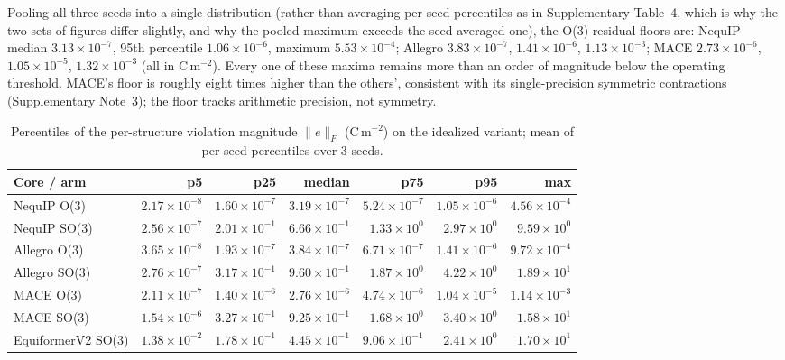 Pooling all three seeds into a single distribution (rather than averaging per-seed percentiles as in Supplementary Table~4, which is why the two sets of figures differ slightly, and why the pooled maximum exceeds the seed-averaged one), the O(3) residual floors are: NequIP median $3.13\times10^{-7}$, 95th percentile $1.06\times10^{-6}$, maximum $5.53\times10^{-4}$; Allegro $3.83\times10^{-7}$, $1.41\times10^{-6}$, $1.13\times10^{-3}$; MACE $2.73\times10^{-6}$, $1.05\times10^{-5}$, $1.32\times10^{-3}$ (all in C\,m$^{-2}$). Every one of these maxima remains more than an order of magnitude below the operating threshold. MACE's floor is roughly eight times higher than the others', consistent with its single-precision symmetric contractions (Supplementary Note~3); the floor tracks arithmetic precision, not symmetry.

\begin{table}[htbp]
\centering
\setlength{\tabcolsep}{2pt}
\caption{Percentiles of the per-structure violation magnitude $\lVert e \rVert_F$ (C\,m$^{-2}$) on the idealized variant; mean of per-seed percentiles over 3 seeds.}
\label{stab:distributions}
\fontsize{7bp}{8.5bp}\selectfont
\begin{tabular}{@{}lrrrrrr@{}}
\toprule
Core / arm & p5 & p25 & median & p75 & p95 & max \\
\midrule
NequIP O(3) & $2.17\times10^{-8}$ & $1.60\times10^{-7}$ & $3.19\times10^{-7}$ & $5.24\times10^{-7}$ & $1.05\times10^{-6}$ & $4.56\times10^{-4}$ \\
NequIP SO(3) & $2.56\times10^{-7}$ & $2.01\times10^{-1}$ & $6.66\times10^{-1}$ & $1.33\times10^{0}$ & $2.97\times10^{0}$ & $9.59\times10^{0}$ \\
Allegro O(3) & $3.65\times10^{-8}$ & $1.93\times10^{-7}$ & $3.84\times10^{-7}$ & $6.71\times10^{-7}$ & $1.41\times10^{-6}$ & $9.72\times10^{-4}$ \\
Allegro SO(3) & $2.76\times10^{-7}$ & $3.17\times10^{-1}$ & $9.60\times10^{-1}$ & $1.87\times10^{0}$ & $4.22\times10^{0}$ & $1.89\times10^{1}$ \\
MACE O(3) & $2.11\times10^{-7}$ & $1.40\times10^{-6}$ & $2.76\times10^{-6}$ & $4.74\times10^{-6}$ & $1.04\times10^{-5}$ & $1.14\times10^{-3}$ \\
MACE SO(3) & $1.54\times10^{-6}$ & $3.27\times10^{-1}$ & $9.25\times10^{-1}$ & $1.68\times10^{0}$ & $3.40\times10^{0}$ & $1.58\times10^{1}$ \\
EquiformerV2 SO(3) & $1.38\times10^{-2}$ & $1.78\times10^{-1}$ & $4.45\times10^{-1}$ & $9.06\times10^{-1}$ & $2.41\times10^{0}$ & $1.70\times10^{1}$ \\
\bottomrule
\end{tabular}

\end{table}

